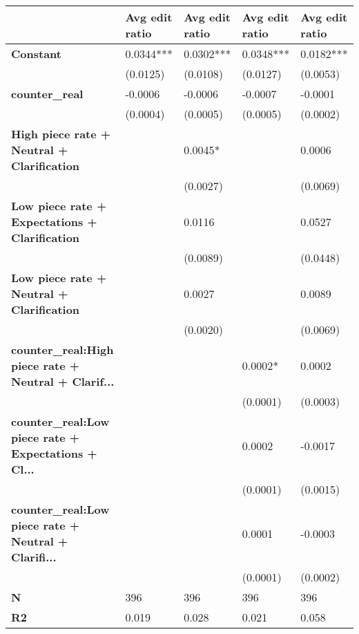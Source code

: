 \begin{tabular}{lllll}
\toprule
{} & Avg edit ratio & Avg edit ratio & Avg edit ratio & Avg edit ratio \\
\midrule
\textbf{Constant                                          } &      0.0344*** &      0.0302*** &      0.0348*** &      0.0182*** \\
                                                   &       (0.0125) &       (0.0108) &       (0.0127) &       (0.0053) \\
\textbf{counter\_real                                      } &        -0.0006 &        -0.0006 &        -0.0007 &        -0.0001 \\
                                                   &       (0.0004) &       (0.0005) &       (0.0005) &       (0.0002) \\
\textbf{High piece rate + Neutral + Clarification         } &                &        0.0045* &                &         0.0006 \\
                                                   &                &       (0.0027) &                &       (0.0069) \\
\textbf{Low piece rate + Expectations + Clarification     } &                &         0.0116 &                &         0.0527 \\
                                                   &                &       (0.0089) &                &       (0.0448) \\
\textbf{Low piece rate + Neutral + Clarification          } &                &         0.0027 &                &         0.0089 \\
                                                   &                &       (0.0020) &                &       (0.0069) \\
\textbf{counter\_real:High piece rate + Neutral + Clarif...} &                &                &        0.0002* &         0.0002 \\
                                                   &                &                &       (0.0001) &       (0.0003) \\
\textbf{counter\_real:Low piece rate + Expectations + Cl...} &                &                &         0.0002 &        -0.0017 \\
                                                   &                &                &       (0.0001) &       (0.0015) \\
\textbf{counter\_real:Low piece rate + Neutral + Clarifi...} &                &                &         0.0001 &        -0.0003 \\
                                                   &                &                &       (0.0001) &       (0.0002) \\
\textbf{N                                                 } &            396 &            396 &            396 &            396 \\
\textbf{R2                                                } &          0.019 &          0.028 &          0.021 &          0.058 \\
\bottomrule
\end{tabular}
